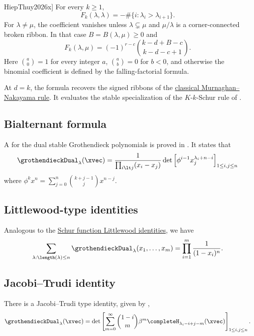 \begin{theorem}[Hiep--Thuy, \cite[Thm.~2.1]{HiepThuy2026x}]
For every $k\geq1$,
\[
 F_k(\lambda,\lambda)=-\#\{i:\lambda_i>\lambda_{i+1}\}.
\]
For $\lambda\ne\mu$, the coefficient vanishes unless $\lambda\subsetneq\mu$
and $\mu/\lambda$ is a corner-connected broken ribbon. In that case
$B=B(\lambda,\mu)\geq0$ and
\[
 F_k(\lambda,\mu)=(-1)^{r-c}
   \binom{k-d+B-c}{k-d-c+1}.
\]
Here $\binom a0=1$ for every integer $a$, $\binom ab=0$ for $b<0$,
and otherwise the binomial coefficient is defined by the falling-factorial
formula.
\end{theorem}

At $d=k$, the formula recovers the signed ribbons of the
\hyperref[murnaghanNakayamaRule]{classical Murnaghan--Nakayama rule}.
It evaluates the stable specialization of the
$K$-$k$-Schur rule of \cite{Nguyen2022x}.

\subsection[grothendieckDualStableBialternant]{Bialternant formula}


A \label{bialternantFormula} for the dual stable Grothendieck polynomials
is proved in \cite[Thm.~17]{Yeliussizov2019}.
It states that
\begin{align}
\grothendieckDual_{\lambda}(\xvec) = \frac{1}{ \prod_{i \lt j} (x_i-x_j)}
\det\left[
\phi^{i-1}x_j^{\lambda_i+n-i}
\right]_{1\leq i,j \leq n}
\end{align}
where $\phi^k x^n = \sum_{j=0}^n \binom{k+j-1}{j}x^{n-j}$.


\subsection[grothendieckDualStableLittlewood]{Littlewood-type identities}


Analogous to the \hyperref[schurSums]{Schur function Littlewood identities}, we
have
\[
\sum_{\lambda : \length(\lambda)\leq n} \grothendieckDual_\lambda(x_1,\dotsc,x_m) = \prod_{i=1}^m \frac{1}{(1-x_i)^n}.
\]



\subsection[grothendieckDualStableJacobiTrudi]{Jacobi--Trudi identity}

There is a Jacobi--Trudi type identity, given by \cite[Prop.~4.4]{Iwao2019},
\begin{align}
\grothendieckDual_\lambda(\xvec) =
\det\left[
\sum_{m=0}^\infty \binom{1-i}{m} \beta^m \completeH_{\lambda_i-i+j-m}(\xvec)
\right]_{1\leq i,j \leq n}.
\end{align}


